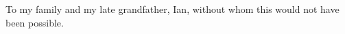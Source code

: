 \begin{dedication}
  To my family and my late grandfather, Ian, without whom this would not
  have been possible.
\end{dedication}
